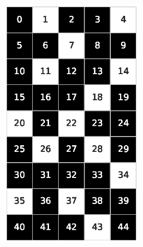 \begin{figure}[h!]
\begin{subfigure}[b]{\textwidth}
\begin{subfigure}[b]{0.20\textwidth}
            \includegraphics[width=\columnwidth]{images/Tai45c_9x5_70.eps}
        \end{subfigure}
     \end{subfigure}
     \caption{Soluzioni delle istanze Tai45c a densità 30\%, 50\% e 70\%}
     \vspace*{1cm}
     \begin{subfigure}[b]{\textwidth}
        \centering
        \begin{subfigure}[b]{0.20\textwidth}

\end{subfigure}
\end{subfigure}
\end{figure}
